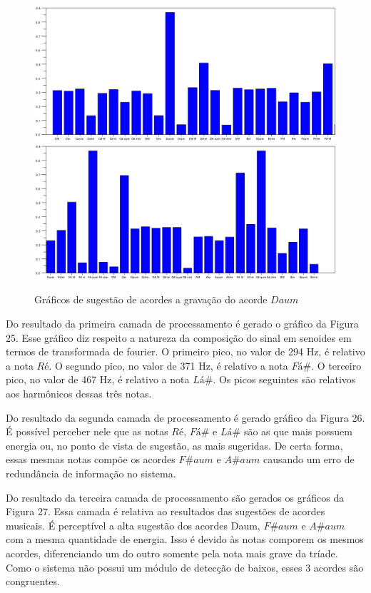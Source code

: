 \begin{figure}[h]
	\centering
		\includegraphics[keepaspectratio=true,scale=0.49]{figuras/Dm/acordes_1_Daum.eps}
		\includegraphics[keepaspectratio=true,scale=0.49]{figuras/Dm/acordes_2_Daum.eps}
	\caption{Gráficos de sugestão de acordes a gravação do acorde $Daum$}
\end{figure}
\newpage

Do resultado da primeira camada de processamento é gerado o gráfico da Figura 25. Esse gráfico diz respeito a natureza da composição do sinal em senoides em termos de transformada de fourier. O primeiro pico, no valor de 294 Hz, é relativo a nota $Ré$. O segundo pico, no valor de 371 Hz, é relativo a nota $Fá\#$. O terceiro pico, no valor de 467 Hz, é relativo a nota $Lá\#$. Os picos seguintes são relativos aos harmônicos dessas três notas.

Do resultado da segunda camada de processamento é gerado gráfico da Figura 26. É possível perceber nele que as notas $Ré$, $Fá\#$ e $Lá\#$ são as que mais possuem energia ou, no ponto de vista de sugestão, as mais sugeridas. De certa forma, essas mesmas notas compõe os acordes $F\#aum$ e $A\#aum$ causando um erro de redundância de informação no sistema.

Do resultado da terceira camada de processamento são gerados os gráficos da Figura 27. Essa camada é relativa ao resultados das sugestões de acordes musicais. É perceptível a alta sugestão dos acordes Daum, $F\#aum$ e $A\#aum$ com a mesma quantidade de energia. Isso é devido às notas comporem os mesmos acordes, diferenciando um do outro somente pela nota mais grave da tríade. Como o sistema não possui um módulo de detecção de baixos, esses 3 acordes são congruentes.



